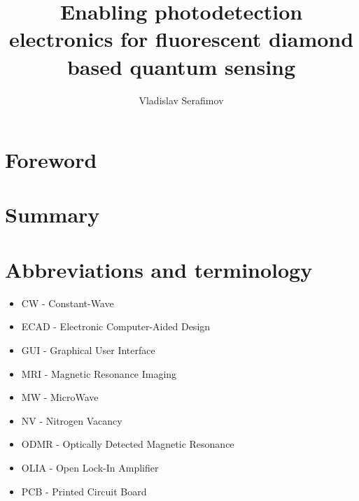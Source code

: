 \documentclass{report}
\title{Enabling photodetection electronics for 
	fluorescent diamond based quantum sensing}
\author{Vladislav Serafimov}
\begin{document}
	\maketitle
	
	
	
	\tableofcontents
	\chapter{Foreword}
	
	
	\chapter{Summary}
	
	
	
	\chapter{Abbreviations and terminology}
	\begin{itemize}
		\item{CW - Constant-Wave}
		\item{ECAD - Electronic Computer-Aided Design}
		\item{GUI - Graphical User Interface}
		\item{MRI - Magnetic Resonance Imaging}
		\item{MW - MicroWave}	
		\item{NV - Nitrogen Vacancy}
		\item{ODMR - Optically Detected Magnetic Resonance}
		\item{OLIA - Open Lock-In Amplifier}
		\item{PCB - Printed Circuit Board}
	\end{itemize}
	
\end{document}
